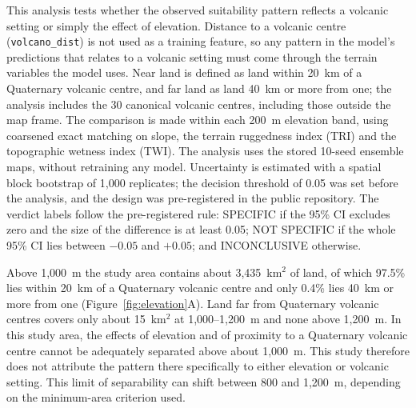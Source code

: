 \documentclass[12pt]{article}
\begin{document}
This analysis tests whether the observed suitability pattern reflects a volcanic setting or simply the effect of elevation.
Distance to a volcanic centre (\texttt{volcano\_dist}) is not used as a training feature, so any pattern in the model's predictions that relates to a volcanic setting must come through the terrain variables the model uses.
Near land is defined as land within 20~km of a Quaternary volcanic centre, and far land as land 40~km or more from one; the analysis includes the 30 canonical volcanic centres, including those outside the map frame.
The comparison is made within each 200~m elevation band, using coarsened exact matching on slope, the terrain ruggedness index (TRI) and the topographic wetness index (TWI).
The analysis uses the stored 10-seed ensemble maps, without retraining any model.
Uncertainty is estimated with a spatial block bootstrap of 1,000 replicates; the decision threshold of 0.05 was set before the analysis, and the design was pre-registered in the public repository.
The verdict labels follow the pre-registered rule: SPECIFIC if the 95\% CI excludes zero and the size of the difference is at least 0.05; NOT SPECIFIC if the whole 95\% CI lies between $-0.05$ and $+0.05$; and INCONCLUSIVE otherwise.

Above 1,000~m the study area contains about 3,435~km$^2$ of land, of which 97.5\% lies within 20~km of a Quaternary volcanic centre and only 0.4\% lies 40~km or more from one (Figure~\ref{fig:elevation}A).
Land far from Quaternary volcanic centres covers only about 15~km$^2$ at 1,000--1,200~m and none above 1,200~m.
In this study area, the effects of elevation and of proximity to a Quaternary volcanic centre cannot be adequately separated above about 1,000~m.
This study therefore does not attribute the pattern there specifically to either elevation or volcanic setting.
This limit of separability can shift between 800 and 1,200~m, depending on the minimum-area criterion used.
\end{document}
